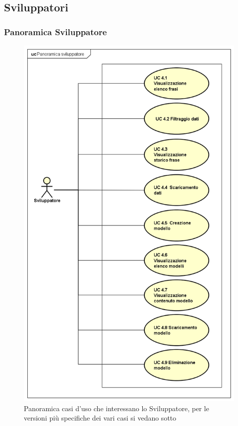 \subsection{Sviluppatori}
\subsubsection{Panoramica Sviluppatore}
\begin{figure}[H]
\centering
\includegraphics[width=17cm, height = 19cm]{img/UC4x.png} 
\caption{Panoramica casi d'uso che interessano lo Sviluppatore, per le versioni più specifiche dei vari casi si vedano sotto}\label{fig:4x}
\end{figure}
